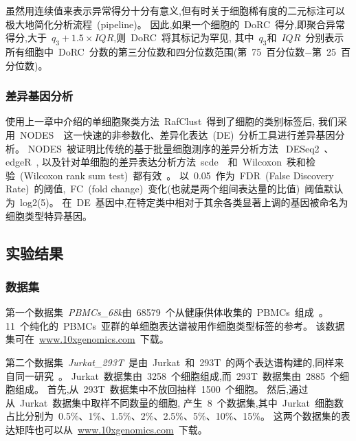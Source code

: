 虽然用连续值来表示异常得分十分有意义,但有时关于细胞稀有度的二元标注可以极大地简化分析流程~(pipeline)。
因此,如果一个细胞的~DoRC~得分,即聚合异常得分,大于~$q_3 + 1.5 \times IQR$,则~DoRC~将其标记为罕见,
其中~$q_3$和~$IQR$~分别表示所有细胞中~DoRC~分数的第三分位数和四分位数范围(第~75~百分位数$-$第~25~百分位数)。

\subsubsection{差异基因分析}
\label{subsec:de}

使用上一章中介绍的单细胞聚类方法~RafClust~得到了细胞的类别标签后,
我们采用~NODES~\cite{Sengupta049734}~这一快速的非参数化、差异化表达~(DE)~分析工具进行差异基因分析。
NODES~被证明比传统的基于批量细胞测序的差异分析方法~DESeq2~\cite{love2014moderated}、edgeR~\cite{robinson2010edger},
以及针对单细胞的差异表达分析方法~scde~\cite{kharchenko2014bayesian}~和~Wilcoxon~秩和检验~(Wilcoxon rank sum test)~都有效~\cite{Sengupta049734}。
以~0.05~作为~FDR~(False Discovery Rate)~的阈值,~FC~(fold change)~变化(也就是两个组间表达量的比值)~阈值默认为~log2(5)。
在~DE~基因中,在特定类中相对于其余各类显著上调的基因被命名为细胞类型特异基因。


\subsection{实验结果}

\subsubsection{数据集}
\label{subsec:datasets} 

第一个数据集~\textit{PBMCs\_68k}由~68579~个从健康供体收集的~PBMCs~组成~\cite{zheng2017massively}。
11~个纯化的~PBMCs~亚群的单细胞表达谱被用作细胞类型标签的参考。
该数据集可在~\url{www.10xgenomics.com}~下载。


第二个数据集~\textit{Jurkat\_293T}~是由~Jurkat~和~293T~的两个表达谱构建的,同样来自同一研究~\cite{zheng2017massively}。
Jurkat~数据集由~3258~个细胞组成,而~293T~数据集由~2885~个细胞组成。
首先,从~293T~数据集中不放回抽样~1500~个细胞。
然后,通过从~Jurkat~数据集中取样不同数量的细胞,
产生~8~个数据集,其中~Jurkat~细胞数占比分别为~0.5\%、1\%、1.5\%、2\%、2.5\%、5\%、10\%、15\%。
这两个数据集的表达矩阵也可以从~\url{www.10xgenomics.com}~下载。

